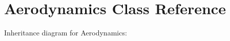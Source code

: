 \hypertarget{classAerodynamics}{}\section{Aerodynamics Class Reference}
\label{classAerodynamics}


Inheritance diagram for Aerodynamics\+:
